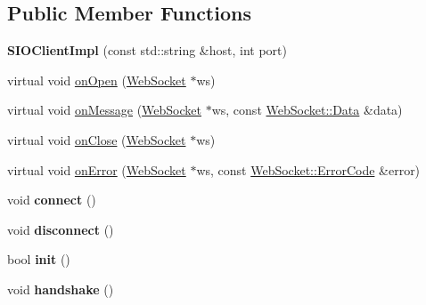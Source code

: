 \subsection*{Public Member Functions}
\begin{DoxyCompactItemize}
\item 
\mbox{\label{classnetwork_1_1SIOClientImpl_ace498c9fc318bd93a6c347788953f62c}} 
{\bfseries S\+I\+O\+Client\+Impl} (const std\+::string \&host, int port)
\item 
virtual void \hyperlink{classnetwork_1_1SIOClientImpl_a2ee5b0255879e53fde247ee9dad7ac71}{on\+Open} (\hyperlink{classnetwork_1_1WebSocket}{Web\+Socket} $\ast$ws)
\item 
virtual void \hyperlink{classnetwork_1_1SIOClientImpl_a73369054407916b5a13c9e4c0501d547}{on\+Message} (\hyperlink{classnetwork_1_1WebSocket}{Web\+Socket} $\ast$ws, const \hyperlink{structnetwork_1_1WebSocket_1_1Data}{Web\+Socket\+::\+Data} \&data)
\item 
virtual void \hyperlink{classnetwork_1_1SIOClientImpl_aa46a4a3264dfecd4b1393f71ce3ef8fa}{on\+Close} (\hyperlink{classnetwork_1_1WebSocket}{Web\+Socket} $\ast$ws)
\item 
virtual void \hyperlink{classnetwork_1_1SIOClientImpl_a903007575dfa680fc980fe11ac88b61e}{on\+Error} (\hyperlink{classnetwork_1_1WebSocket}{Web\+Socket} $\ast$ws, const \hyperlink{classnetwork_1_1WebSocket_a33c111a23355ac485e3a56c9d0ab9a59}{Web\+Socket\+::\+Error\+Code} \&error)
\item 
\mbox{\label{classnetwork_1_1SIOClientImpl_ace3b7641a3b6b2861efa61a81f02344f}} 
void {\bfseries connect} ()
\item 
\mbox{\label{classnetwork_1_1SIOClientImpl_a131d6f0f75fff86f7dc84069c14ea956}} 
void {\bfseries disconnect} ()
\item 
\mbox{\label{classnetwork_1_1SIOClientImpl_a9ae985d3d67c8461f26713a943102f25}} 
bool {\bfseries init} ()
\item 
\mbox{\label{classnetwork_1_1SIOClientImpl_a61f2f5737c3b218a5d10778edf0a528d}} 
void {\bfseries handshake} ()
\item 
\mbox{\label{classnetwork_1_1SIOClientImpl_a66a5d40f431df264d658b24f5ce200b6}} 

\end{DoxyCompactItemize}
